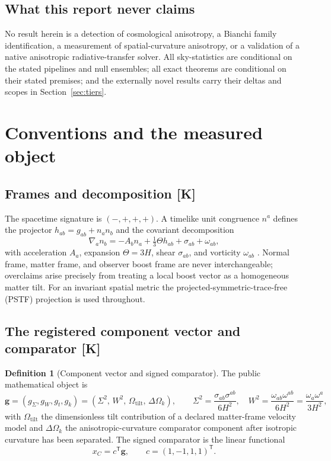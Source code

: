 \documentclass[10pt]{article}
\theoremstyle{definition}
\newtheorem{definition}[theorem]{Definition}
\newcommand{\tier}[1]{\textbf{[#1]}}
\newcommand{\OmT}{\Omega_{\mathrm{tilt}}}
\newcommand{\dOk}{\Delta\Omega_{k}}
\begin{document}
\subsection{What this report never claims}

No result herein is a detection of cosmological anisotropy, a Bianchi
family identification, a measurement of spatial-curvature anisotropy,
or a validation of a native anisotropic radiative-transfer solver. All
sky-statistics are conditional on the stated pipelines and null
ensembles; all exact theorems are conditional on their stated premises;
and the externally novel results carry their deltas and scopes in
Section~\ref{sec:tiers}.

\section{Conventions and the measured object}
\label{sec:conv}

\subsection{Frames and decomposition \tier{K}}

The spacetime signature is $(-,+,+,+)$. A timelike unit congruence
$n^a$ defines the projector $h_{ab} = g_{ab} + n_a n_b$ and the
covariant decomposition
\begin{equation}
\nabla_a n_b = -A_b n_a + \tfrac{1}{3}\Theta h_{ab} + \sigma_{ab}
 + \omega_{ab},
\end{equation}
with acceleration $A_a$, expansion $\Theta = 3H$, shear $\sigma_{ab}$,
and vorticity $\omega_{ab}$ \cite{EllisVanElst1999}. Normal frame,
matter frame, and observer boost frame are never interchangeable;
overclaims arise precisely from treating a local boost vector as a
homogeneous matter tilt. For an invariant spatial metric the
projected-symmetric-trace-free (PSTF) projection is used throughout.

\subsection{The registered component vector and comparator \tier{K}}

\begin{definition}[Component vector and signed comparator]
\label{def:g}
The public mathematical object is
\begin{equation}
\bm g = (g_\Sigma, g_W, g_t, g_k)
      = \left(\Sigma^2,\, W^2,\, \OmT,\, \dOk\right),
\qquad
\Sigma^2 = \frac{\sigma_{ab}\sigma^{ab}}{6H^2},\quad
W^2 = \frac{\omega_{ab}\omega^{ab}}{6H^2} = \frac{\omega_a\omega^a}{3H^2},
\end{equation}
with $\OmT$ the dimensionless tilt contribution of a declared
matter-frame velocity model and $\dOk$ the anisotropic-curvature
comparator component after isotropic curvature has been separated.
The signed comparator is the linear functional
\begin{equation}
x_C = c^{\mathsf T}\bm g, \qquad c = (1,-1,1,1)^{\mathsf T}.
\end{equation}
\end{definition}
\end{document}
